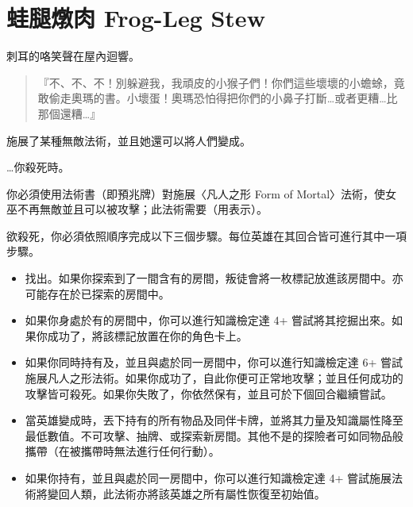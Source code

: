 
\chapter{蛙腿燉肉 Frog-Leg Stew}

\begin{HauntStory}
	刺耳的咯笑聲在屋內迴響。
	\begin{quote}
		『不、不、不！別躲避我，我頑皮的小猴子們！你們這些壞壞的小蟾蜍，竟敢偷走奧瑪的書。小壞蛋！奧瑪恐怕得把你們的小鼻子打斷…或者更糟…比那個還糟…』
	\end{quote}
\end{HauntStory}

施展了某種無敵法術，並且她還可以將人們變成。

…你殺死時。

你必須使用法術書（即預兆牌）對施展〈凡人之形 Form of Mortal〉法術，使女巫不再無敵並且可以被攻擊；此法術需要（用表示）。

欲殺死，你必須依照順序完成以下三個步驟。每位英雄在其回合皆可進行其中一項步驟。
\begin{itemize}
	\item 找出。如果你探索到了一間含有的房間，叛徒會將一枚標記放進該房間中。亦可能存在於已探索的房間中。
	\item 如果你身處於有的房間中，你可以進行知識檢定達 4+ 嘗試將其挖掘出來。如果你成功了，將該標記放置在你的角色卡上。
	\item 如果你同時持有及，並且與處於同一房間中，你可以進行知識檢定達 6+ 嘗試施展凡人之形法術。如果你成功了，自此你便可正常地攻擊；並且任何成功的攻擊皆可殺死。如果你失敗了，你依然保有，並且可於下個回合繼續嘗試。
\end{itemize}

\vfill\null\pagebreak

\vspace*{-1em}
\begin{itemize}
	\item 當英雄變成時，丟下持有的所有物品及同伴卡牌，並將其力量及知識屬性降至最低數值。不可攻擊、抽牌、或探索新房間。其他不是的探險者可如同物品般攜帶（在被攜帶時無法進行任何行動）。
	\item 如果你持有，並且與處於同一房間中，你可以進行知識檢定達 4+ 嘗試施展法術將變回人類，此法術亦將該英雄之所有屬性恢復至初始值。
\end{itemize}

